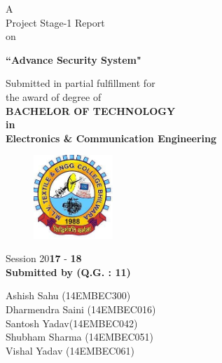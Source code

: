 \documentclass[twoside,a4paper,16pt]{book}
\begin{document}
	
	
	
	\frontmatter
	\thispagestyle{empty}
	
	
	
	
	\begin{center}
		{\Large A \\ Project Stage-1 Report\\ on \\
			\vspace{0.5cm}
			
			{\bf ``Advance Security System"}}
	\end{center}
	
	\vspace{0.3cm}
	\begin{center}
		\Large Submitted in partial fulfillment for \\\vspace{0.5cm} the award of degree of\\\vspace{0.5cm}
		{\bf  BACHELOR OF TECHNOLOGY\\\vspace{0.5cm}in\\\vspace{0.5cm}Electronics \& Communication Engineering}
	\end{center}
	\vspace{0.6cm}
	
	\begin{figure}[ht!]
		\begin{center}
			\includegraphics[width=3.0cm]{logo.jpg}
		\end{center}
	\end{figure}
	
	\vspace{0.2cm}
	
	\begin{center}
		\large Session 20{\bf17} - {\bf18}\\\vspace{0.5cm}
		{\bf Submitted by (Q.G. : 11)}\\
			\end{center}
		\begin{center}
			{\large	\hspace{0.4cm}Ashish Sahu (14EMBEC300)\\\hspace{1.4cm}
			Dharmendra Saini (14EMBEC016)\\\hspace{0.8cm}Santosh Yadav(14EMBEC042)\\\hspace{1.5cm}Shubham Sharma (14EMBEC051)\\\hspace{0.65cm}Vishal Yadav (14EMBEC061)}
				\end{center}
	
\end{document}
